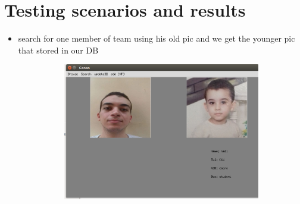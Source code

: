\documentclass[pdftex,10pt,a4paper,oneside]{article}
\begin{document}
	
	 
	
	
	
	\pagebreak
	\section{Testing scenarios and results}
	\begin{itemize}
		\item search for one member of team  using his old pic and we get the younger pic that stored in our DB
	
	\begin{figure}[H]
		\centering
		\includegraphics[width=120mm,height=60mm]{fig/17.png}
	\end{figure}
	

\end{itemize}
\end{document}
